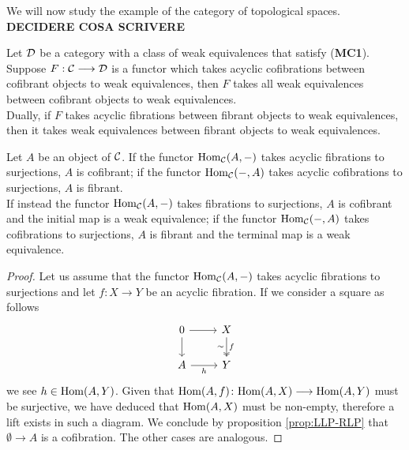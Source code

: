 \begin{example}
	We will now study the example of the category of topological spaces.\\
	\textbf{DECIDERE COSA SCRIVERE}
\end{example}


\begin{lemma}
	Let $\mathcal{D}$ be a category with a class of weak equivalences that satisfy (\textbf{MC1}). Suppose $F: \mathcal{C} \longrightarrow \mathcal{D}$ is a functor which takes acyclic cofibrations between cofibrant objects to weak equivalences, then $F$ takes all weak equivalences between cofibrant objects to weak equivalences. \\
	Dually, if $F$ takes acyclic fibrations between fibrant objects to weak equivalences, then it takes weak equivalences between fibrant objects to weak equivalences.
\end{lemma}

\begin{lemma}
	\label{lem:fib-to-surj}
	Let $A$ be an object of $\mathcal{C}$. If the functor $\mathrm{Hom}_{\mathcal{C}}(A,{-})$ takes acyclic fibrations to surjections, $A$ is cofibrant; if the functor $\mathrm{Hom}_{\mathcal{C}}({-},A)$ takes acyclic cofibrations to surjections, $A$ is fibrant. \\
	If instead the functor $\mathrm{Hom}_{\mathcal{C}}(A,{-})$ takes fibrations to surjections, $A$ is cofibrant and the initial map is a weak equivalence; if the functor $\mathrm{Hom}_{\mathcal{C}}({-},A)$ takes cofibrations to surjections, $A$ is fibrant and the terminal map is a weak equivalence.
\end{lemma}
\begin{proof}
	Let us assume that the functor $\mathrm{Hom}_{\mathcal{C}}(A,{-})$ takes acyclic fibrations to surjections and let $f\colon X \longrightarrow Y$ be an acyclic fibration. If we consider a square as follows
	\[\begin{tikzcd}
		0 & X \\
		A & Y
		\arrow[from=1-1, to=1-2]
		\arrow[from=1-1, to=2-1]
		\arrow["f", "\sim"', two heads, from=1-2, to=2-2]
		\arrow["h"', from=2-1, to=2-2]
	\end{tikzcd}\]
	we see $h \in \mathrm{Hom}(A,Y)$. Given that $\mathrm{Hom}(A,f)\colon \mathrm{Hom}(A,X) \longrightarrow \mathrm{Hom}(A,Y)$ must be surjective, we have deduced that $\mathrm{Hom}(A,X)$ must be non-empty, therefore a lift exists in such a diagram. We conclude by proposition \ref{prop:LLP-RLP} that $\emptyset \longrightarrow A$ is a cofibration. The other cases are analogous.
\end{proof}

